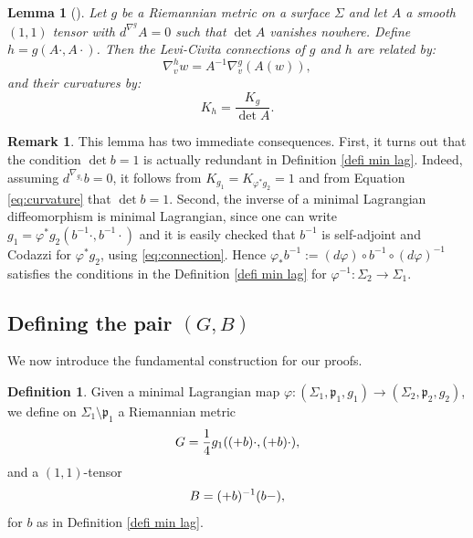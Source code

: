 \documentclass[11pt]{article}
\makeatletter
\DeclareRobustCommand{\mathbbm}[1]{\csname jepbb@#1\endcsname}
\newtheorem{lemma}[cor]{Lemma}
\theoremstyle{definition}
\newtheorem{defi}[cor]{Definition}
\newtheorem{remark}[cor]{Remark}
\makeatother
\begin{document}
\begin{lemma}[{\cite[Prop.\,3.12]{zbMATH05200423}}] \label{lemma KS}
Let $g$ be a Riemannian metric on a surface $\Sigma$ and let $A$ a smooth $(1,1)$ tensor with $d^{\nabla^g}\!\!A=0$ such that $\det A$ vanishes nowhere. Define $h=g(A\cdot,A\cdot)$. Then the Levi-Civita connections of $g$ and $h$ are related by:
\begin{equation}\label{eq:connection}
\nabla^h_v w=A^{-1}\nabla^g_v(A(w)),
\end{equation}
and their curvatures by:
\begin{equation}\label{eq:curvature}
K_h=\frac{K_g}{\det A}.
\end{equation}
\end{lemma}

\begin{remark} \label{rmk:detb}
This lemma has two immediate consequences. First, it turns out that the condition $\det b=1$ is actually redundant in Definition \ref{defi min lag}. Indeed, assuming $d^{\nabla_{g_1}}b=0$, it follows from $K_{g_1}=K_{\varphi^*g_2}=1$ and from Equation \eqref{eq:curvature} that
$\det b=1$. Second, the inverse of a minimal Lagrangian diffeomorphism is minimal Lagrangian, since one can write $g_1=\varphi^*g_2(b^{-1}\cdot,b^{-1}\cdot)$ and it is easily checked that $b^{-1}$ is self-adjoint and Codazzi for $\varphi^*g_2$, using \eqref{eq:connection}. Hence $\varphi_*b^{-1}:=(d\varphi)\circ b^{-1}\circ (d\varphi)^{-1}$ satisfies the conditions in the Definition \ref{defi min lag} for $\varphi^{-1}:\Sigma_2\to\Sigma_1$.
\end{remark}

\subsection{Defining the pair $(G,B)$}
We now introduce the fundamental construction for our proofs.

\begin{defi} \label{defi GB}
Given a minimal Lagrangian map $\varphi:(\Sigma_1,\mathfrak p_1,g_1)\to (\Sigma_2,\mathfrak p_2,g_2)$, we define on $\Sigma_1\setminus\mathfrak p_1$ a Riemannian metric
\[
G=\frac{1}{4}g_1((\mathbbm 1+b)\cdot,(\mathbbm 1+b)\cdot),
\]
and a $(1,1)$-tensor
\[
B=(\mathbbm 1+b)^{-1}(b-\mathbbm 1),
\]
for $b$ as in Definition \ref{defi min lag}.
\end{defi}
\end{document}
